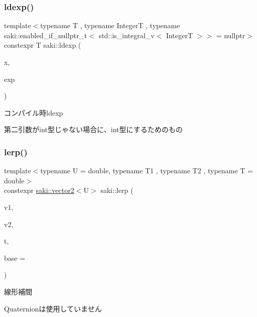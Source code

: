 \subsubsection{\texorpdfstring{ldexp()}{ldexp()}}
{\footnotesize\ttfamily template$<$typename T , typename IntegerT , typename saki\+::enabled\+\_\+if\+\_\+nullptr\+\_\+t$<$ std\+::is\+\_\+integral\+\_\+v$<$ Integer\+T $>$$>$  = nullptr$>$ \\
constexpr T saki\+::ldexp (\begin{DoxyParamCaption}\item[{T}]{x,  }\item[{IntegerT}]{exp }\end{DoxyParamCaption})}



コンパイル時ldexp 

第二引数がint型じゃない場合に、int型にするためのもの \mbox{\label{namespacesaki_aca2e4449261f40ee6f47abc49844e66c}} 
\subsubsection{\texorpdfstring{lerp()}{lerp()}\hspace{0.1cm}{\footnotesize\ttfamily [1/3]}}
{\footnotesize\ttfamily template$<$typename U  = double, typename T1 , typename T2 , typename T  = double$>$ \\
constexpr \mbox{\hyperlink{classsaki_1_1vector2}{saki\+::vector2}}$<$U$>$ saki\+::lerp (\begin{DoxyParamCaption}\item[{const \mbox{\hyperlink{classsaki_1_1vector2}{saki\+::vector2}}$<$ T1 $>$ \&}]{v1,  }\item[{const \mbox{\hyperlink{classsaki_1_1vector2}{saki\+::vector2}}$<$ T2 $>$ \&}]{v2,  }\item[{const T \&}]{t,  }\item[{const T \&}]{base = {} }\end{DoxyParamCaption})}



線形補間 

Quaternionは使用していません \mbox{\label{namespacesaki_acc3cd6d8e07cbfcd2691c4d9ffe25416}} 

